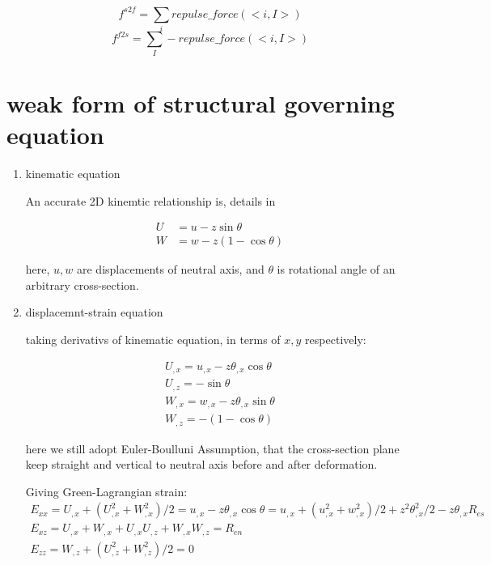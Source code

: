 \documentclass[11pt]{article}
\begin{document}
$$ f^{s2f} = \sum_i repulse\_force(<i,I>) $$
$$ f^{f2s} = \sum_I -repulse\_force(<i,I>) $$

\section{weak form of structural governing equation}

\begin{enumerate}

\item{kinematic equation}

An accurate 2D kinemtic relationship is, details in \cite[p.~215]{limingrui}

\begin{subequations}
 \begin{align}
	U &= u - z \sin \theta \\
	W &= w - z(1- \cos \theta)
  \end{align}
 \end{subequations}

here, $u, w$ are displacements of neutral axis, and $\theta$ is rotational angle of an arbitrary cross-section.

\item{displacemnt-strain equation}

taking derivativs of kinematic equation, in terms of $x,y$ respectively:

 \begin{subequations}
	\begin{align}
	U_{,x} = u_{,x} - z \theta_{,x} \cos \theta \\
	U_{,z} = - \sin \theta \\
	W_{,x} = w_{,x} - z \theta_{,x} \sin \theta \\
	W_{,z} = -(1- \cos \theta)
	\end{align}
\end{subequations}

here we still adopt Euler-Boulluni Assumption, that the cross-section plane keep straight and vertical to neutral axis before and after deformation.

Giving Green-Lagrangian strain:
 \begin{subequations}
	\begin{align}
	E_{xx} = U_{,x} + ( U_{,x}^2 + W_{,x}^2)/2 = u_{,x} - z \theta_{,x} \cos \theta = u_{,x} + ( u_{,x}^2 + w_{,x}^2)/2 + z^2 \theta_{,x}^2/2 - z \theta_{,x} R_{es}  \\
	E_{xz} = U_{,x} + W_{,x} + U_{,x} U_{,z} + W_{,x} W_{,z} = R_{en} \\ 
	E_{zz} = W_{,z} + ( U_{,z}^2 + W_{,z}^2)/2 = 0
	\end{align}
\end{subequations}


\end{enumerate}
\end{document}
